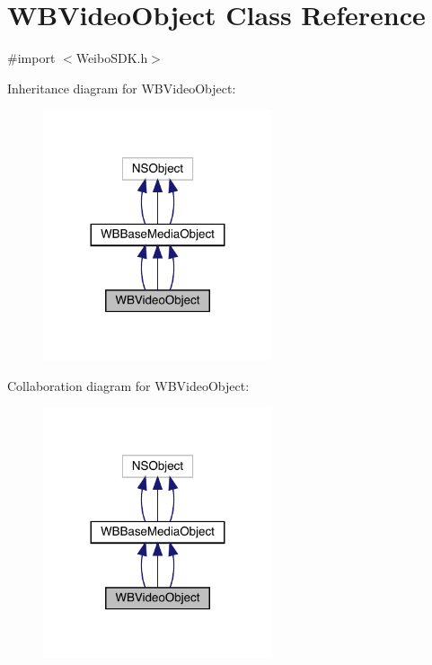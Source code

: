 \hypertarget{interface_w_b_video_object}{}\section{W\+B\+Video\+Object Class Reference}
\label{interface_w_b_video_object}


{\ttfamily \#import $<$Weibo\+S\+D\+K.\+h$>$}



Inheritance diagram for W\+B\+Video\+Object\+:\nopagebreak
\begin{figure}[H]
\begin{center}
\leavevmode
\includegraphics[width=191pt]{interface_w_b_video_object__inherit__graph}
\end{center}
\end{figure}


Collaboration diagram for W\+B\+Video\+Object\+:\nopagebreak
\begin{figure}[H]
\begin{center}
\leavevmode
\includegraphics[width=191pt]{interface_w_b_video_object__coll__graph}
\end{center}
\end{figure}
